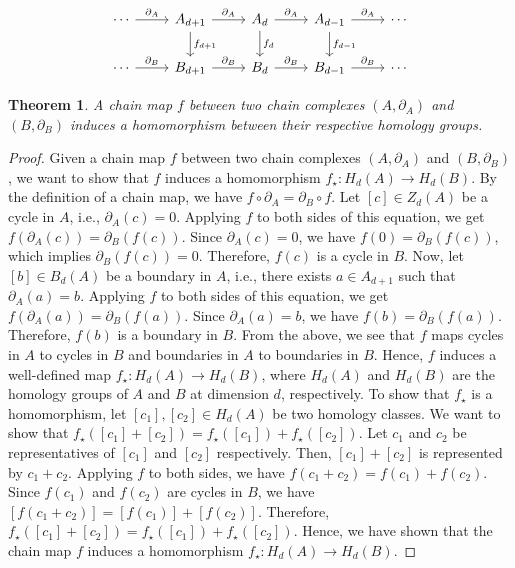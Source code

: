 \documentclass{amsart}
\newtheorem{theorem}[section]{Theorem}
\begin{document}
\begin{equation}
\begin{tikzcd}
\cdots \arrow[r, "\partial_A"] & A_{d+1} \arrow[r, "\partial_A"] \arrow[d, "f_{d+1}"] & A_d \arrow[r, "\partial_A"] \arrow[d, "f_d"] & A_{d-1} \arrow[r, "\partial_A"] \arrow[d, "f_{d-1}"] & \cdots \\
\cdots \arrow[r, "\partial_B"] & B_{d+1} \arrow[r, "\partial_B"]                                  & B_d \arrow[r, "\partial_B"]                              & B_{d-1} \arrow[r, "\partial_B"]                                  & \cdots
\end{tikzcd}
\end{equation}

\begin{theorem}
\label{chainmaps}
A chain map $f$ between two chain complexes $(A, \partial_A)$ and $(B,\partial_B)$ induces a homomorphism between their respective homology groups.
\end{theorem}

\begin{proof}
Given a chain map $f$ between two chain complexes $(A, \partial_A)$ and $(B,\partial_B)$, we want to show that $f$ induces a homomorphism $f_\star: H_d(A) \rightarrow H_d(B)$. By the definition of a chain map, we have $f \circ \partial_A = \partial_B \circ f$. Let $[c] \in Z_d(A)$ be a cycle in $A$, i.e., $\partial_A(c) = 0$. Applying $f$ to both sides of this equation, we get $f(\partial_A(c)) = \partial_B(f(c))$. Since $\partial_A(c) = 0$, we have $f(0) = \partial_B(f(c))$, which implies $\partial_B(f(c)) = 0$. Therefore, $f(c)$ is a cycle in $B$. Now, let $[b] \in B_d(A)$ be a boundary in $A$, i.e., there exists $a \in A_{d+1}$ such that $\partial_A(a) = b$. Applying $f$ to both sides of this equation, we get $f(\partial_A(a)) = \partial_B(f(a))$. Since $\partial_A(a) = b$, we have $f(b) = \partial_B(f(a))$. Therefore, $f(b)$ is a boundary in $B$. From the above, we see that $f$ maps cycles in $A$ to cycles in $B$ and boundaries in $A$ to boundaries in $B$. Hence, $f$ induces a well-defined map $f_\star: H_d(A) \rightarrow H_d(B)$, where $H_d(A)$ and $H_d(B)$ are the homology groups of $A$ and $B$ at dimension $d$, respectively. To show that $f_\star$ is a homomorphism, let $[c_1], [c_2] \in H_d(A)$ be two homology classes. We want to show that $f_\star([c_1] + [c_2]) = f_\star([c_1]) + f_\star([c_2])$. Let $c_1$ and $c_2$ be representatives of $[c_1]$ and $[c_2]$ respectively. Then, $[c_1] + [c_2]$ is represented by $c_1 + c_2$. Applying $f$ to both sides, we have $f(c_1 + c_2) = f(c_1) + f(c_2)$. Since $f(c_1)$ and $f(c_2)$ are cycles in $B$, we have $[f(c_1 + c_2)] = [f(c_1)] + [f(c_2)]$. Therefore, $f_\star([c_1] + [c_2]) = f_\star([c_1]) + f_\star([c_2])$. Hence, we have shown that the chain map $f$ induces a homomorphism $f_\star: H_d(A) \rightarrow H_d(B)$.
\end{proof}
\end{document}
